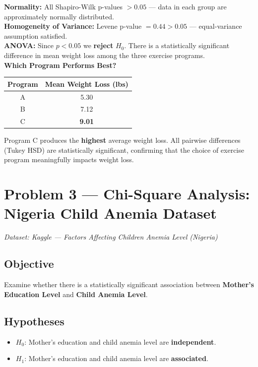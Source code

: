 \documentclass[12pt,a4paper]{article}
\begin{document}
\begin{interpbox}
\textbf{Normality:} All Shapiro-Wilk p-values $> 0.05$ — data in each group are approximately normally distributed. \\[4pt]
\textbf{Homogeneity of Variance:} Levene p-value $= 0.44 > 0.05$ — equal-variance assumption satisfied. \\[4pt]
\textbf{ANOVA:} Since $p < 0.05$ we \textbf{reject} $H_0$. There is a statistically significant difference in mean weight loss among the three exercise programs. \\[4pt]
\textbf{Which Program Performs Best?}
\begin{center}
\begin{tabular}{cc}
\toprule
Program & Mean Weight Loss (lbs) \\
\midrule
A       & 5.30 \\
B       & 7.12 \\
C       & \textbf{9.01} \\
\bottomrule
\end{tabular}
\end{center}
Program C produces the \textbf{highest} average weight loss. All pairwise differences (Tukey HSD) are statistically significant, confirming that the choice of exercise program meaningfully impacts weight loss.
\end{interpbox}

\newpage
\section{Problem 3 — Chi-Square Analysis: Nigeria Child Anemia Dataset}

\textit{Dataset: Kaggle — Factors Affecting Children Anemia Level (Nigeria)}

\subsection{Objective}
Examine whether there is a statistically significant association between \textbf{Mother's Education Level} and \textbf{Child Anemia Level}.

\subsection{Hypotheses}
\begin{itemize}[noitemsep]
  \item $H_0$: Mother's education and child anemia level are \textbf{independent}.
  \item $H_1$: Mother's education and child anemia level are \textbf{associated}.
\end{itemize}
\end{document}

